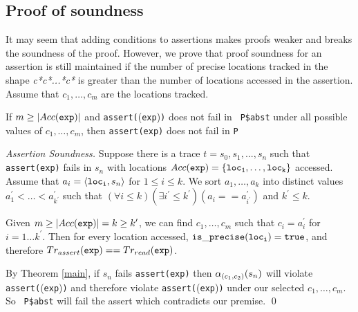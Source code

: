 \subsection{Proof of soundness}
It may seem that adding conditions to assertions makes proofs weaker and breaks the soundness of the proof. However, we prove that proof soundness 
for an assertion is still maintained if the number of precise locations tracked in the shape {\it *c*c*...*c*} is greater than the number of 
locations accessed in the assertion. Assume that \(c_1, \dots, c_m\) are the locations tracked.

\begin{theorem}\label{assert}
 
    If \(m\geq \lvert Acc{\tt (exp)}\rvert\) and {\tt assert(}\tras({\tt exp}){\tt)} does not fail in {\tt
      P\$abst} under all possible values of \(c_1, \dots, c_m\), then {\tt assert(exp)} does not fail in {\tt P}
      
\end{theorem}

\begin{proof}[Assertion Soundness]

    Suppose there is a trace \(t = s_0, s_1,...,s_n\) such
  that {\tt assert(exp)} fails in \(s_n\) with locations \(Acc({\tt exp})=\{{\tt loc_1, \dots, loc_k}\}\) accessed. 
  Assume that \(a_i=\langle {\tt loc_i}, s_n\rangle\) for \(1\leq i\leq k\). We sort \(a_1, \dots, a_k\) into distinct 
  values \(a_1^\prime<\dots<a_{k^\prime}^\prime\) such that \(\left(\forall i\leq k\right)\left(\exists i^\prime\leq k^\prime\right)\left(a_i==a_{i^\prime}^\prime\right)\)
  and \(k^\prime\leq k\).

  Given \(m\geq \lvert Acc({\tt exp})\rvert=k\geq k^\prime\), 
  we can find \(c_1, \dots, c_m\) such that \(c_i=a_i^\prime\) for \(i=1\dots k^\prime\). Then for every location accessed, 
  \({\tt is\_precise(loc_i)=true}\), and therefore \(Tr_{assert}({\tt exp})==Tr_{read}({\tt exp})\). 

  By Theorem \ref{main}, if \(s_n\) fails {\tt assert(exp)} then \(\alpha_{(c_1,c_2)}(s_n)\) will violate \\ {\tt assert(}\trrd({\tt exp}){\tt)} 
  and therefore violate {\tt assert(}\tras({\tt exp}){\tt)} under our selected \(c_1, \dots, c_m\). So {\tt
  P\$abst} will fail the assert which contradicts our premise. \qed
  
\end{proof}

